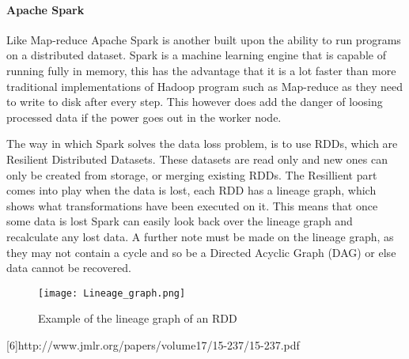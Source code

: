 \paragraph{Apache Spark}
Like Map-reduce Apache Spark is another built upon the ability to run programs
on a distributed dataset. Spark is a machine learning engine that is capable of
running fully in memory\cite{Sparkwebsite}, this has the advantage that it is a lot faster than
more traditional implementations of Hadoop program such as Map-reduce as they need
to write to disk after every step. This however does add the danger of loosing processed data
 if the power goes out in the worker node.

The way in which Spark solves the data loss problem, is to use RDDs, which are
Resilient Distributed Datasets. These datasets are read only and new ones can
only be created from storage, or merging existing RDDs\cite{Zaha12}. The Resillient part comes
into play when the data is lost, each RDD has a lineage graph, which shows what
transformations have been executed on it. This means that once some data is lost
Spark can easily look back over the lineage graph and recalculate any lost data.
A further note must be made on the lineage graph, as they may not contain a cycle
and so be a Directed Acyclic Graph (DAG) or else data cannot be recovered.

\begin{figure}
  \texttt{[image: Lineage\_graph.png]}
  \caption{Example of the lineage graph of an RDD\cite{Zaha12}}
  \label{lineagegraph}
\end{figure}




[6]http://www.jmlr.org/papers/volume17/15-237/15-237.pdf %
